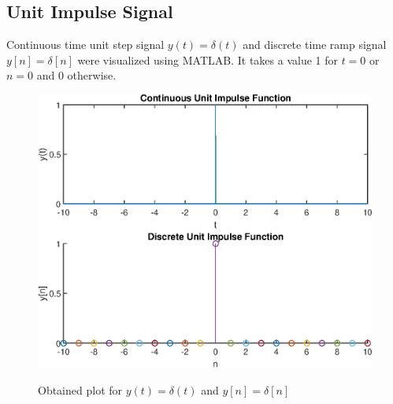 \documentclass{lab_sheet}
\begin{document}
    \subsection{Unit Impulse Signal}
    Continuous time unit step signal $y(t)= \delta(t)$ and discrete time ramp signal $y[n]=\delta[n]$ were visualized using MATLAB. It takes a value 1 for $t=0$ or $n=0$ and 0 otherwise.
    \begin{figure}[H]
        \centering
        \includegraphics[scale=0.6]{./Figures/unit_impulse}
        \label{fig:unit_impulse}
        \caption{Obtained plot for $y(t)=\delta(t)$ and $y[n]=\delta[n]$}
    \end{figure}
\end{document}
